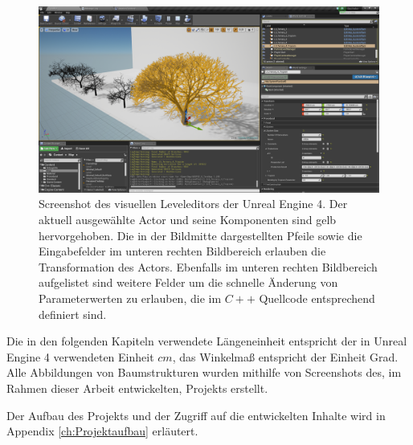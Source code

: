 \begin{figure} [ht]
	\centering
	\includegraphics[width=\textwidth]{images/ScreenshotUE4Editor.png}
	\caption{Screenshot des visuellen Leveleditors der Unreal Engine 4. Der aktuell ausgewählte Actor und seine Komponenten sind gelb hervorgehoben. Die in der Bildmitte dargestellten Pfeile sowie die Eingabefelder im unteren rechten Bildbereich erlauben die Transformation des Actors. Ebenfalls im unteren rechten Bildbereich aufgelistet sind weitere Felder um die schnelle Änderung von Parameterwerten zu erlauben, die im $C++$ Quellcode entsprechend definiert sind. }
	\label{fig:ScreenshotUE4Editor}
\end{figure}


Die in den folgenden Kapiteln verwendete Längeneinheit entspricht der in Unreal Engine 4 verwendeten Einheit \grqq$cm$\grqq, das Winkelmaß entspricht der Einheit \glqq Grad\grqq. Alle Abbildungen von Baumstrukturen wurden mithilfe von Screenshots des, im Rahmen dieser Arbeit entwickelten, Projekts erstellt.

Der Aufbau des Projekts und der Zugriff auf die entwickelten Inhalte wird in Appendix \ref{ch:Projektaufbau} erläutert.